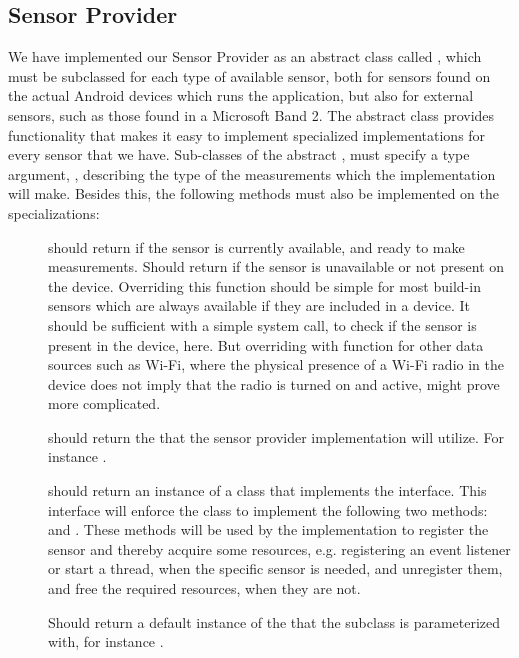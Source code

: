 \subsection{Sensor Provider}
\label{sub:providing_sensor_data_implementation}
We have implemented our Sensor Provider as an abstract class called , which must be subclassed for each type of available sensor, both for sensors found on the actual Android devices which runs the application, but also for external sensors, such as those found in a Microsoft Band 2. The abstract class provides functionality that makes it easy to implement specialized implementations for every sensor that we have. Sub-classes of the abstract , must specify a type argument, , describing the type of the measurements which the implementation will make. Besides this, the following methods must also be implemented on the specializations:


\begin{description}
	\item[] should return  if the sensor is currently available, and ready to make measurements. Should return  if the sensor is unavailable or not present on the device. Overriding this function should be simple for most build-in sensors which are always available if they are included in a device. It should be sufficient with a simple system call, to check if the sensor is present in the device, here. But overriding with function for other data sources such as Wi-Fi, where the physical presence of a Wi-Fi radio in the device does not imply that the radio is turned on and active, might prove more complicated.   

	\item[] should return the  that the sensor provider implementation will utilize. For instance .

	\item[] should return an instance of a class that implements the  interface. This interface will enforce the class to implement the following two methods:  and . These methods will be used by the  implementation to register the sensor and thereby acquire some resources, e.g. registering an event listener or start a thread, when the specific sensor is needed, and unregister them, and free the required resources, when they are not.

  \item[] Should return a default instance of the  that the subclass is parameterized with, for instance .
\end{description}

